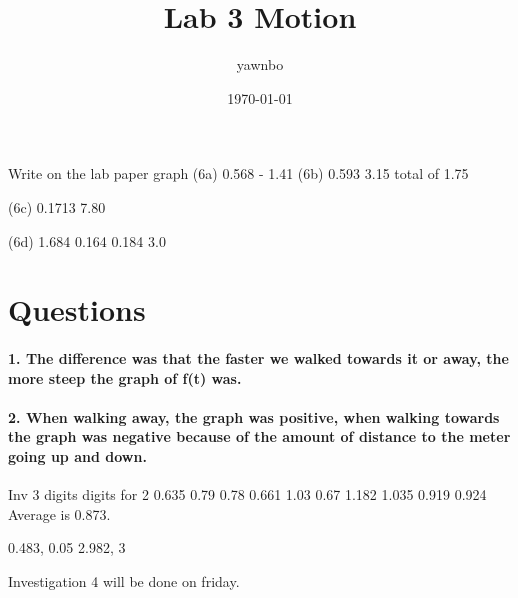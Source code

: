 \documentclass[a4paper]{article}
\title{Lab 3 Motion}
\author{yawnbo}
\date{\today}
\begin{document}
\maketitle
Write on the lab paper graph (6a) 
0.568 - 1.41
(6b)
0.593 3.15 total of 1.75

(6c)
0.1713 7.80

(6d)
1.684 0.164
0.184 3.0

\section*{Questions}%
\label{sec:Questions}
\paragraph{1. The difference was that the faster we walked towards it or away, the more steep the graph of f(t) was. }
\paragraph{2. When walking away, the graph was positive, when walking towards the graph was negative because of the amount of distance to the meter going up and down. }

Inv 3 digits
digits for 2
0.635 0.79 0.78 0.661 1.03 0.67 1.182 1.035 0.919 0.924 
Average is 0.873. 

0.483, 0.05
2.982, 3

Investigation 4 will be done on friday. 
\end{document}
